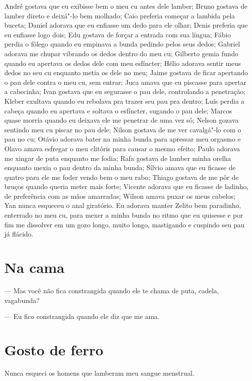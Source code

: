 André gostava que eu exibisse bem o meu cu antes dele lamber; Bruno
gostava de lamber direto e deixá"-lo bem molhado; Caio preferia começar a
lambida pela buceta; Daniel adorava que eu enfiasse um dedo para ele
olhar; Denis preferia que eu enfiasse logo dois; Edu gostava de forçar a
entrada com sua língua; Fábio perdia o fôlego quando eu empinava a bunda
pedindo pelos seus dedos; Gabriel adorava me chupar vibrando os dedos
dentro do meu cu; Gilberto gemia fundo quando eu apertava os dedos dele
com meu esfíncter; Hélio adorava sentir meus dedos no seu cu enquanto
metia os dele no meu; Jaime gostava de ficar apertando o pau dele contra
o meu cu, sem entrar; Juca amava que eu piscasse para apertar a
cabecinha; Ivan gostava que eu segurasse o pau dele, controlando a
penetração; Kleber exultava quando eu rebolava pra trazer seu pau pra
dentro; Luís perdia a cabeça quando eu apertava e soltava o esfíncter,
sugando o pau dele; Marcos quase morria quando eu deixava ele me
penetrar de uma vez só; Nelson gozava sentindo meu cu piscar no pau
dele; Nilson gostava de me ver cavalgá"-lo com o pau no cu; Otávio
adorava bater na minha bunda para apressar meu orgasmo e Olavo amava
esfregar o meu clitóris para causar o mesmo efeito; Paulo adorava me
xingar de puta enquanto me fodia; Rafa gostava de lamber minha orelha
enquanto mexia o pau dentro da minha bunda; Sílvio amava que eu ficasse
de quatro para ele me foder vendo bem o meu rabo; Thiago gostava de me
pôr de bruços quando queria meter mais forte; Vicente adorava que eu
ficasse de ladinho, de preferência com as mãos amarradas; Wilson amava
puxar os meus cabelos; Yan nunca esqueceu o anal giratório. Eu adorava
manter Zelito bem paradinho, enterrado no meu cu, para mexer a minha
bunda no ritmo que eu quisesse e por fim me dissolver em um gozo longo,
muito longo, mastigando e cuspindo seu pau já flácido.

\chapter{Na cama}

\mbox{}\indent{}--- Mas você não fica constrangida quando ele te chama de puta, cadela,
vagabunda?

--- Eu fico constrangida quando ele diz que me ama.

\chapter{Gosto de ferro}

Nunca esqueci os homens que lamberam meu sangue menstrual.

